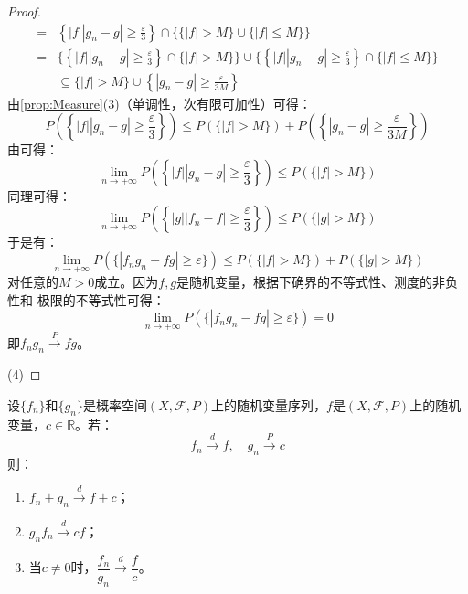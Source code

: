 \begin{proof}
\begin{align*}
		=&\left\{|f||g_n-g|\geqslant\frac{\varepsilon}{3}\right\}\cap\Big\{\{|f|>M\}\cup\{|f|\leqslant M\}\Big\} \\
		=&\Big\{\left\{|f||g_n-g|\geqslant\frac{\varepsilon}{3}\right\}\cap\{|f|>M\}\Big\}\cup\Big\{\left\{|f||g_n-g|\geqslant\frac{\varepsilon}{3}\right\}\cap\{|f|\leqslant M\}\Big\} \\
		&\subseteq\{|f|>M\}\cup\left\{|g_n-g|\geqslant\frac{\varepsilon}{3M}\right\}
	\end{align*}
	由\cref{prop:Measure}(3)（单调性，次有限可加性）可得：
	\begin{equation*}
		P\left(\left\{|f||g_n-g|\geqslant\frac{\varepsilon}{3}\right\}\right)\leqslant P(\{|f|>M\})+P\left(\left\{|g_n-g|\geqslant\frac{\varepsilon}{3M}\right\}\right)
	\end{equation*}
	由可得：
	\begin{equation*}
		\lim_{n\to+\infty}P\left(\left\{|f||g_n-g|\geqslant\frac{\varepsilon}{3}\right\}\right)\leqslant P(\{|f|>M\})
	\end{equation*}
	同理可得：
	\begin{equation*}
		\lim_{n\to+\infty}P\left(\left\{|g||f_n-f|\geqslant\frac{\varepsilon}{3}\right\}\right)\leqslant P(\{|g|>M\})
	\end{equation*}
	于是有：
	\begin{equation*}
		\lim_{n\to+\infty}P(\{|f_ng_n-fg|\geqslant\varepsilon\})\leqslant P(\{|f|>M\})+P(\{|g|>M\})
	\end{equation*}
	对任意的$M>0$成立。因为$f,g$是随机变量，根据下确界的不等式性、测度的非负性和 极限的不等式性可得：
	\begin{equation*}
		\lim_{n\to+\infty}P(\{|f_ng_n-fg|\geqslant\varepsilon\})=0
	\end{equation*}
	即$f_ng_n\overset{P}{\longrightarrow}fg$。\par
	(4)
\end{proof}
\begin{theorem}\label{theo:Slutsky}
	设$\{f_n\}$和$\{g_n\}$是概率空间$(X,\mathscr{F},P)$上的随机变量序列，$f$是$(X,\mathscr{F},P)$上的随机变量，$c\in\mathbb{R}$。若：
	\begin{equation*}
		f_n\overset{d}{\longrightarrow}f,\quad g_n\overset{P}{\longrightarrow}c
	\end{equation*}
	则：
	\begin{enumerate}
		\item $f_n+g_n\overset{d}{\longrightarrow}f+c$；
		\item $g_nf_n\overset{d}{\longrightarrow}cf$；
		\item 当$c\ne0$时，$\dfrac{f_n}{g_n}\overset{d}{\longrightarrow}\dfrac{f}{c}$。
	\end{enumerate}
\end{theorem}
